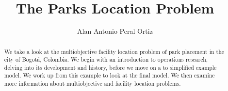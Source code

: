 \documentclass[12pt]{pom_thesis}
\author{Alan Antonio Peral Ortiz}
\title{The Parks Location Problem}
\begin{document}
\maketitle

\begin{abstract}We take a look at the multiobjective facility location problem of park placement in the city of Bogot\'{a}, Colombia. We begin with an introduction to operations research, delving into its development and history, before we move on a to simplified example model. We work up from this example to look at the final model. We then examine more information about multiobjective and facility location problems.
\end{abstract}

\tableofcontents

\newpage
{}
\end{document}
